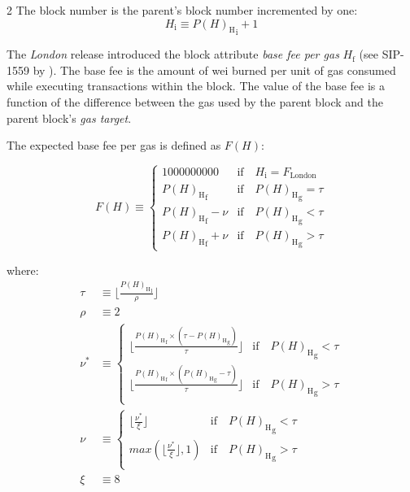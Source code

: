 \documentclass[9pt,oneside]{amsart}
\makeatletter
\newcommand{\linkdest}[1]{\Hy@raisedlink{\hypertarget{#1}{}}}
\makeatother
\begin{document}
\begin{multicols}{2}
\hypertarget{block_number_H__i}{}The block number is the parent's block number incremented by one:
\begin{equation}
H_{\mathrm{i}} \equiv {{P(H)_{\mathrm{H}}}_{\mathrm{i}}} + 1
\end{equation}

\newcommand{\mindifficulty}{D_\mathrm{min}}
\newcommand{\homesteadmod}{\ensuremath{\varsigma_2}}
\newcommand{\expdiffsymb}{\ensuremath{\epsilon}}
\newcommand{\diffadjustment}{x}

\linkdest{H__f}The \textit{London} release introduced the block attribute \textit{base fee per gas} \hyperlink{block_baseFeePerGas_H__f}{$H_{\mathrm{f}}$} (see SIP-1559 by \cite{SIP-1559}).
The base fee is the amount of wei burned per unit of gas consumed while executing transactions within the block.
The value of the base fee is a function of the difference between the gas used by the parent block and the parent block's \textit{gas target}.

The expected base fee per gas is defined as $F(H)$:

\begin{equation}
  F(H) \equiv \begin{cases} 
    1000000000  & \text{if} \quad H_{\mathrm{i}} = F_{\mathrm{London}} \\
    {P(H)_{\mathrm{H}}}_{\mathrm{f}}  & \text{if} \quad {P(H)_{\mathrm{H}}}_{\mathrm{g}} = \tau \\
    {P(H)_{\mathrm{H}}}_{\mathrm{f}} - \nu & \text{if} \quad {P(H)_{\mathrm{H}}}_{\mathrm{g}} < \tau \\
    {P(H)_{\mathrm{H}}}_{\mathrm{f}} + \nu & \text{if} \quad {P(H)_{\mathrm{H}}}_{\mathrm{g}} > \tau
  \end{cases}
  \end{equation}

where:
  \begin{align}
    \tau &\equiv \lfloor\frac{{P(H)_{\mathrm{H}}}_{\mathrm{l}}}{\rho} \rfloor \\
    \rho &\equiv 2 \\
    \nu^* &\equiv \begin{cases}
      \lfloor \frac{{P(H)_{\mathrm{H}}}_{\mathrm{f}} \times ({\tau - P(H)_{\mathrm{H}}}_{\mathrm{g}})}{\tau} \rfloor &  \text{if} \quad {P(H)_{\mathrm{H}}}_{\mathrm{g}} < \tau \\
      \lfloor \frac{{P(H)_{\mathrm{H}}}_{\mathrm{f}} \times ({P(H)_{\mathrm{H}}}_{\mathrm{g}} - \tau)}{\tau} \rfloor &  \text{if} \quad {P(H)_{\mathrm{H}}}_{\mathrm{g}} > \tau \\
  \end{cases} \\
  \nu &\equiv \begin{cases}
    \lfloor \frac{\nu^*}{\xi} \rfloor &  \text{if} \quad {P(H)_{\mathrm{H}}}_{\mathrm{g}} < \tau \\
    max(\lfloor \frac{\nu^*}{\xi} \rfloor, 1) &  \text{if} \quad {P(H)_{\mathrm{H}}}_{\mathrm{g}} > \tau \\
  \end{cases} \\
  \xi &\equiv 8
\end{align}


\end{multicols}
\end{document}
